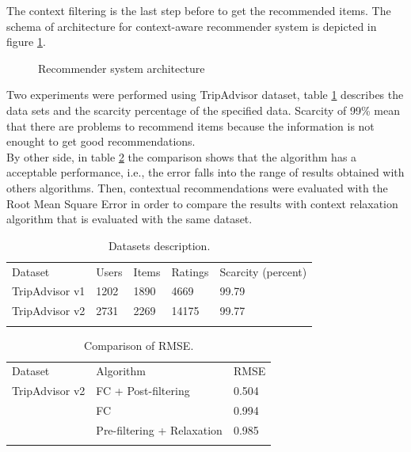 The context filtering is the last step before to get the recommended
items. The schema of architecture for context-aware recommender system
is depicted in figure \ref{fig:architecture}.
\begin{figure}
\captionsetup{justification=centering,margin=2cm}
\centering
{}
\caption{Recommender system architecture}
\label{fig:architecture}   
\end{figure}
Two experiments were performed using TripAdvisor dataset, table
\ref{tab:3} describes the data sets and the scarcity percentage of the
specified data. Scarcity of 99\% mean that there are problems to
recommend items because the information is not enought to get 
good recommendations.\\  By other side, in table \ref{tab:4} the comparison
shows that the algorithm has a acceptable performance, i.e., the error
falls into the range of results obtained with others algorithms. Then,
contextual recommendations were evaluated with the Root Mean Square
Error in order to compare the results with context relaxation
algorithm\cite{zheng2012differential} that is evaluated with the same
dataset.
\begin{table}
\centering
\small
\caption{Datasets description.}
\label{tab:3}      
\begin{tabular}{lllll}
\hline\noalign{\smallskip}
Dataset & Users & Items & Ratings & Scarcity (percent) \\
\noalign{\smallskip}\hline\noalign{\smallskip}
TripAdvisor v1 & 1202 & 1890 & 4669 & 99.79 \\
TripAdvisor v2 & 2731 & 2269 & 14175 & 99.77 \\
\noalign{\smallskip}\hline
\end{tabular}
\end{table}

\begin{table}
\centering
\small
\caption{Comparison of RMSE.}
\label{tab:4}  
\small   
\begin{tabular}{lll}
\hline\noalign{\smallskip}
Dataset & Algorithm & RMSE \\
\noalign{\smallskip}\hline\noalign{\smallskip}
TripAdvisor v2 & FC + Post-filtering  & 0.504  \\
               & FC          & 0.994  \\
               & Pre-filtering + Relaxation & 0.985  \\
\noalign{\smallskip}\hline
\end{tabular}
\end{table}

